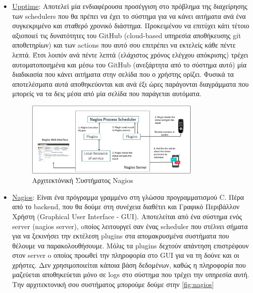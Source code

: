\begin{itemize}
	\item \href{https://github.com/upptime/upptime}{Upptime}: Αποτελεί μία ενδιαφέρουσα προσέγγιση στο πρόβλημα
	      της διαχείρησης των schedulers που θα πρέπει να έχει το σύστημα για να κάνει αιτήματα ανά ένα συγκεκριμένο
	      και σταθερό χρονικό διάστημα. Προκειμένου να επιτύχει κάτι τέτοιο αξιοποιεί τις δυνατότητες του GitHub (cloud-based υπηρεσία αποθήκευσης git αποθετηρίων)
	      και των actions που αυτό σου επιτρέπει να εκτελείς κάθε πέντε λεπτά. Έτσι λοιπόν ανά πέντε λεπτά (ελάχιστος χρόνος ελέγχου απόκρισης)
	      τρέχει αυτοματοποιημένα και μέσω του GitHub (ανεξάρτητα από το σύστημα αυτό) μία διαδικασία που κάνει αιτήματα στην σελίδα που ο χρήστης ορίζει.
	      Φυσικά τα αποτελέσματα αυτά αποθηκεύονται και ανά έξι ώρες παράγονται διαγράμματα που μπορείς να τα δεις μέσα από μία σελίδα που παράγεται αυτόματα.
	      \begin{figure}[!ht]
		      \centering
		      \includegraphics[width=0.8\textwidth]{./images/chapter3/nagios.jpg}
		      \caption[Αρχιτεκτόνική Συστήματος Nagios]{Αρχιτεκτόνική Συστήματος Nagios}
		      \label{fig:nagios}
	      \end{figure}
	\item \href{https://github.com/NagiosEnterprises/nagioscore}{Nagios}: Είναι ένα πρόγραμμα γραμμένο στη γλώσσα προγραμματισμού
	      C. Πέρα από το backend, που θα δούμε στη συνέχεια διαθέτει και Γραφικό Περιβάλλον Χρήστη (Graphical User Interface - GUI).
	      Αποτελείται από ένα σύστημα ενός server (nagios server), oποίος λειτουργεί σαν ένας scheduler που στέλνει σήματα
	      για να ξεκινήσει την εκτέλεση plugins στα απομακρυσμένα συστήματα που θέλουμε να παρακολουθήσουμε. Μόλις τα plugins δεχτούν
	      απάντηση επιστρέφουν στον server o οποίος προωθεί την πληροφορία στο GUI για να τη δούνε και οι χρήστες. Δεν χρησιμοποιείται κάποια βάση
	      δεδομένων, καθώς η πληροφορία που μαζεύεται αποθηκεύεται μόνο σε logs στο σύστημα που τρέχει την υπηρεσία αυτή. Την αρχιτεκτονική σου συστήματος μπορούμε
		  δούμε στην \autoref{fig:nagios}

\end{itemize}
